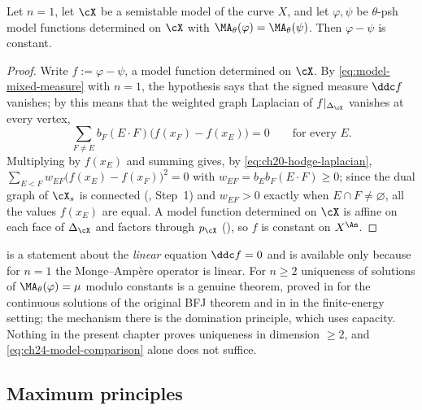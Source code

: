\begin{corollary}
\label{cor:ch24-model-uniqueness-curve}
Let \(n=1\), let \(\cX\) be a semistable model of the curve \(X\), and let
\(\varphi,\psi\) be \(\theta\)-psh model functions determined on \(\cX\)
with \(\MA_\theta(\varphi)=\MA_\theta(\psi)\).  Then \(\varphi-\psi\) is
constant.
\end{corollary}

\begin{proof}
Write \(f:=\varphi-\psi\), a model function determined on \(\cX\).  By
\eqref{eq:model-mixed-measure} with \(n=1\), the hypothesis says that the
signed measure \(\ddc f\) vanishes; by
 this means that the weighted graph
Laplacian of \(f|_{\Delta_{\cX}}\) vanishes at every vertex,
\[
 \sum_{F\neq E}b_F(E\cdot F)\bigl(f(x_F)-f(x_E)\bigr)=0
 \qquad\text{for every }E .
\]
Multiplying by \(f(x_E)\) and summing gives, by
\eqref{eq:ch20-hodge-laplacian},
\(\sum_{E<F}w_{EF}\bigl(f(x_E)-f(x_F)\bigr)^2=0\) with
\(w_{EF}=b_Eb_F(E\cdot F)\geq0\); since the dual graph of \(\cX_s\) is
connected (, Step~1) and \(w_{EF}>0\) exactly when
\(E\cap F\neq\varnothing\), all the values \(f(x_E)\) are equal.  A model
function determined on \(\cX\) is affine on each face of
\(\Delta_{\cX}\) and factors through \(p_{\cX}\)
(), so \(f\) is constant on \(X^{\An}\).
\end{proof}

\begin{remark}
\label{rem:ch24-uniqueness-scope}
 is a statement about the
\emph{linear} equation \(\ddc f=0\) and is available only because for
\(n=1\) the Monge--Amp\`ere operator is linear.  For \(n\geq2\) uniqueness of
solutions of \(\MA_\theta(\varphi)=\mu\) modulo constants is a genuine
theorem, proved in  for the continuous solutions
of the original BFJ theorem and in  in
the finite-energy setting; the mechanism there is the domination principle,
which uses capacity.  Nothing in the present chapter proves uniqueness in
dimension \(\geq2\), and \eqref{eq:ch24-model-comparison} alone does not
suffice.
\end{remark}

\subsection{Maximum principles}
\label{sec:ch24-max}

